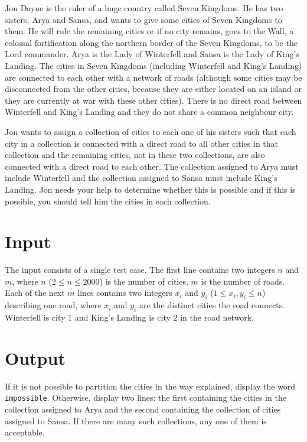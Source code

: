 \newcommand{\maxcities}{2000}


\setlength{\columnsep}{15pt}
%
Jon Dayne is the ruler of a huge country called Seven Kingdoms. He has two sisters, Arya and Sansa, and wants to give some cities of Seven Kingdoms to them. He will rule the remaining cities or if no city remains, goes to the Wall, a colossal fortification along the northern border of the Seven Kingdoms, to be the Lord commander. Arya is the Lady of Winterfell and Sansa is the Lady of King's Landing. The cities in Seven Kingdoms (including Winterfell and King's Landing) are connected to each other with a network of roads (although some cities may be disconnected from the other cities, because they are either located on an island or they are currently at war with these other cities). There is no direct road between Winterfell and King's Landing and they do not share a common neighbour city.

Jon wants to assign a collection of cities to each one of his sisters such that each city in a collection is connected with a direct road to all other cities in that collection and the remaining cities, not in these two collections, are also connected with a direct road to each other. The collection assigned to Arya must include Winterfell and the collection assigned to Sansa must include King's Landing. Jon needs your help to determine whether this is possible and if this is possible, you should tell him the cities in each collection.

\section*{Input}
The input consists of a single test case. The first line contains two integers $n$ and $m$, where $n$ ($2 \le n \le \maxcities$) is the number of cities, $m$ is the number of roads. Each of the next $m$ lines contains two integers $x_i$ and $y_i$ ($1 \le x_i, y_i \le n$) describing one road, where $x_i$ and $y_i$ are the distinct cities the road connects. Winterfell is city $1$ and King's Landing is city $2$ in the road network.


\section*{Output}
If it is not possible to partition the cities in the way explained, display the word {\tt impossible}. Otherwise, display two lines: the first containing the cities in the collection assigned to Arya and the second containing the collection of cities assigned to Sansa. If there are many such collections, any one of them is acceptable.
